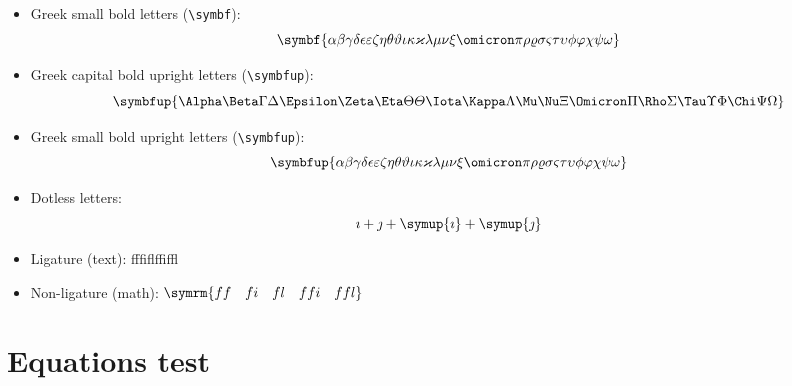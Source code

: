 \documentclass{article}
\def\Greekalphabets{%
  \Alpha      \Beta       \Gamma      \Delta      \Epsilon
  \Zeta       \Eta        \Theta      \varTheta   \Iota
  \Kappa      \Lambda     \Mu         \Nu         \Xi
  \Omicron    \Pi         \Rho        \Sigma      \Tau
  \Upsilon    \Phi        \Chi        \Psi        \Omega
}
\def\greekalphabets{%
  \alpha      \beta       \gamma      \delta      \epsilon
  \varepsilon \zeta       \eta        \theta      \vartheta 
  \iota       \kappa      \varkappa   \lambda     \mu
  \nu         \xi         \omicron    \pi         \rho
  \varrho     \sigma      \varsigma   \tau        \upsilon
  \phi        \varphi     \chi        \psi        \omega
}
\def\ligaturetext{ff\quad fi\quad fl\quad ffi\quad ffl}
\begin{document}
\begin{itemize}
  \item Greek small bold letters (\verb|\symbf|):
        \[ \symbf{\greekalphabets} \]

  \item Greek capital bold upright letters (\verb|\symbfup|):
        \[ \symbfup{\Greekalphabets} \]

  \item Greek small bold upright letters (\verb|\symbfup|):
        \[ \symbfup{\greekalphabets} \]

  \item Dotless letters:
        \[ \imath + \jmath + \symup{\imath} + \symup{\jmath} \]

  \item Ligature (text): {\firatext\ligaturetext}

  \item Non-ligature (math): $ \symrm{\ligaturetext} $
\end{itemize}

\section{Equations test}
\end{document}
